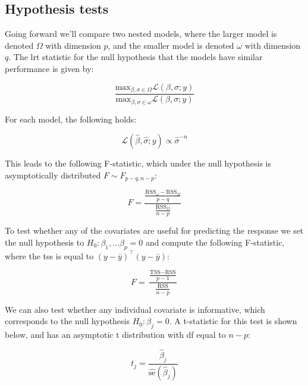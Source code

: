 \documentclass{report}
\begin{document}
\subsection{Hypothesis tests}

Going forward we'll compare two nested models, where the larger model is denoted $\Omega$ with dimension $p$, and the smaller model is denoted $\omega$ with dimension $q$. The \gls{lrt} statistic for the null hypothesis that the models have similar performance is given by:

\begin{equation}\label{eq:ols-lrt-stat}
    \frac{\text{max}_{\beta, \sigma \in \Omega} \mathcal{L}(\beta, \sigma; y)}{\text{max}_{\beta, \sigma \in \omega} \mathcal{L}(\beta, \sigma; y)}
\end{equation}

For each model, the following holds:

\begin{equation}\label{eq:likelihood-prop-to-sigma}
    \mathcal{L}\left(\hat{\beta}, \hat{\sigma}; y\right) \propto \hat{\sigma}^{-n}
\end{equation}

This leads to the following F-statistic, which under the null hypothesis is asymptotically distributed $F \sim F_{p-q, n-p}$:

\begin{equation}\label{eq:ols-f-stat-nested}
    F = \frac{\frac{\text{RSS}_\omega - \text{RSS}_\Omega}{p-q}}{\frac{\text{RSS}_\Omega}{n-p}}
\end{equation}

To test whether any of the covariates are useful for predicting the response we set the null hypothesis to $H_0: \beta_1, \dots \beta_p = 0$ and compute the following F-statistic, where the \gls{tss} is equal to $(y - \bar{y})^\intercal (y - \bar{y})$:

\begin{equation}\label{eq:ols-f-stat-overall}
    F = \frac{\frac{\text{TSS} - \text{RSS}}{p-1}}{\frac{\text{RSS}}{n-p}}
\end{equation}

We can also test whether any individual covariate is informative, which corresponds to the null hypothesis $H_0: \beta_j = 0$. A t-statistic for this test is shown below, and has an asymptotic t distribution with \gls{df} equal to $n-p$:

\begin{equation}\label{eq:ols-t-stat}
    t_j = \frac{\hat{\beta}_j}{\widehat{\text{se}}\left(\hat{\beta}_j\right)}
\end{equation}
\end{document}
